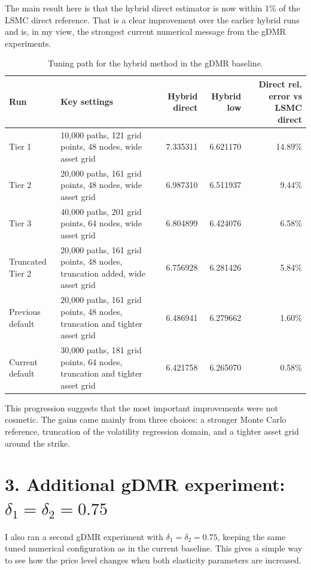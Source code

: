 \documentclass[11pt]{article}
\begin{document}
The main result here is that the hybrid direct estimator is now within 1\% of the LSMC direct reference.
That is a clear improvement over the earlier hybrid runs and is, in my view, the strongest current numerical
message from the gDMR experiments.

\begin{table}[h]
\centering
\caption{Tuning path for the hybrid method in the gDMR baseline.}
\begin{tabularx}{\textwidth}{lXrrr}
\toprule
Run & Key settings & Hybrid direct & Hybrid low & Direct rel. error vs LSMC direct \\
\midrule
Tier 1 & 10,000 paths, 121 grid points, 48 nodes, wide asset grid & 7.335311 & 6.621170 & 14.89\% \\
Tier 2 & 20,000 paths, 161 grid points, 48 nodes, wide asset grid & 6.987310 & 6.511937 & 9.44\% \\
Tier 3 & 40,000 paths, 201 grid points, 64 nodes, wide asset grid & 6.804899 & 6.424076 & 6.58\% \\
Truncated Tier 2 & 20,000 paths, 161 grid points, 48 nodes, truncation added, wide asset grid & 6.756928 & 6.281426 & 5.84\% \\
Previous default & 20,000 paths, 161 grid points, 48 nodes, truncation and tighter asset grid & 6.486941 & 6.279662 & 1.60\% \\
Current default & 30,000 paths, 181 grid points, 64 nodes, truncation and tighter asset grid & 6.421758 & 6.265070 & 0.58\% \\
\bottomrule
\end{tabularx}
\end{table}

This progression suggests that the most important improvements were not cosmetic. The gains came mainly
from three choices: a stronger Monte Carlo reference, truncation of the volatility regression domain, and
a tighter asset grid around the strike.

\section*{3. Additional gDMR experiment: $\delta_1=\delta_2=0.75$}

I also ran a second gDMR experiment with $\delta_1=\delta_2=0.75$, keeping the same tuned numerical
configuration as in the current baseline. This gives a simple way to see how the price level changes when
both elasticity parameters are increased.
\end{document}
